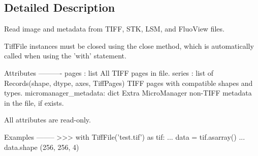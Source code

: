 \subsection{Detailed Description}
\begin{DoxyVerb}Read image and metadata from TIFF, STK, LSM, and FluoView files.

TiffFile instances must be closed using the close method, which is
automatically called when using the 'with' statement.

Attributes
----------
pages : list
    All TIFF pages in file.
series : list of Records(shape, dtype, axes, TiffPages)
    TIFF pages with compatible shapes and types.
micromanager_metadata: dict
    Extra MicroManager non-TIFF metadata in the file, if exists.

All attributes are read-only.

Examples
--------
>>> with TiffFile('test.tif') as tif:
...     data = tif.asarray()
...     data.shape
(256, 256, 4)\end{DoxyVerb}
 

